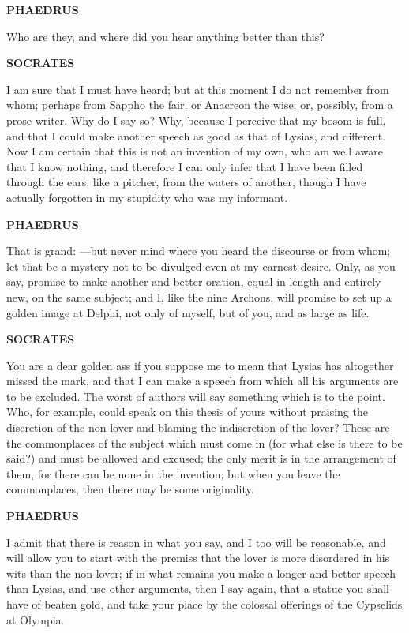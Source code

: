 \documentclass[11pt,letter]{article}
\begin{document}
\par \textbf{PHAEDRUS}
\par   Who are they, and where did you hear anything better than this?

\par \textbf{SOCRATES}
\par   I am sure that I must have heard; but at this moment I do not remember from whom; perhaps from Sappho the fair, or Anacreon the wise; or, possibly, from a prose writer. Why do I say so? Why, because I perceive that my bosom is full, and that I could make another speech as good as that of Lysias, and different. Now I am certain that this is not an invention of my own, who am well aware that I know nothing, and therefore I can only infer that I have been filled through the ears, like a pitcher, from the waters of another, though I have actually forgotten in my stupidity who was my informant.

\par \textbf{PHAEDRUS}
\par   That is grand: —but never mind where you heard the discourse or from whom; let that be a mystery not to be divulged even at my earnest desire. Only, as you say, promise to make another and better oration, equal in length and entirely new, on the same subject; and I, like the nine Archons, will promise to set up a golden image at Delphi, not only of myself, but of you, and as large as life.

\par \textbf{SOCRATES}
\par   You are a dear golden ass if you suppose me to mean that Lysias has altogether missed the mark, and that I can make a speech from which all his arguments are to be excluded. The worst of authors will say something which is to the point. Who, for example, could speak on this thesis of yours without praising the discretion of the non-lover and blaming the indiscretion of the lover? These are the commonplaces of the subject which must come in (for what else is there to be said?) and must be allowed and excused; the only merit is in the arrangement of them, for there can be none in the invention; but when you leave the commonplaces, then there may be some originality.

\par \textbf{PHAEDRUS}
\par   I admit that there is reason in what you say, and I too will be reasonable, and will allow you to start with the premiss that the lover is more disordered in his wits than the non-lover; if in what remains you make a longer and better speech than Lysias, and use other arguments, then I say again, that a statue you shall have of beaten gold, and take your place by the colossal offerings of the Cypselids at Olympia.
\end{document}

